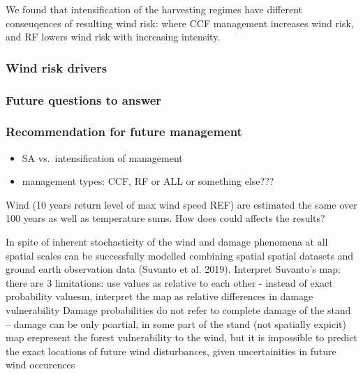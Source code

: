 \documentclass[]{elsarticle} %
\providecommand{\tightlist}{%
  \setlength{\itemsep}{0pt}\setlength{\parskip}{0pt}}
\begin{document}
We found that intensification of the harvesting regimes have different
conseuqences of resulting wind risk: where CCF management increases wind
risk, and RF lowers wind risk with increasing intensity.

\subsubsection{Wind risk drivers}\label{wind-risk-drivers}

\subsubsection{Future questions to
answer}\label{future-questions-to-answer}

\subsubsection{Recommendation for future
management}\label{recommendation-for-future-management}

\begin{itemize}
\tightlist
\item
  SA vs.~intensification of management
\item
  management types: CCF, RF or ALL or something else???
\end{itemize}

Wind (10 years return level of max wind speed REF) are estimated the
same over 100 years as well as temperature sums. How does could affects
the results?

In spite of inherent stochasticity of the wind and damage phenomena at
all spatial scales can be successfully modelled combining spatial
spatial datasets and ground earth observation data (Suvanto et al.
2019). Interpret Suvanto's map: there are 3 limitations: use values as
relative to each other - instead of exact probability valuesm, interpret
the map as relative differences in damage vulnerability Damage
probabilities do not refer to complete damage of the stand -- damage can
be only poartial, in some part of the stand (not spatially expicit) map
erepresent the forest vulnerability to the wind, but it is impossible to
predict the exact locations of future wind disturbances, given
uncertainities in future wind occurences
\end{document}
